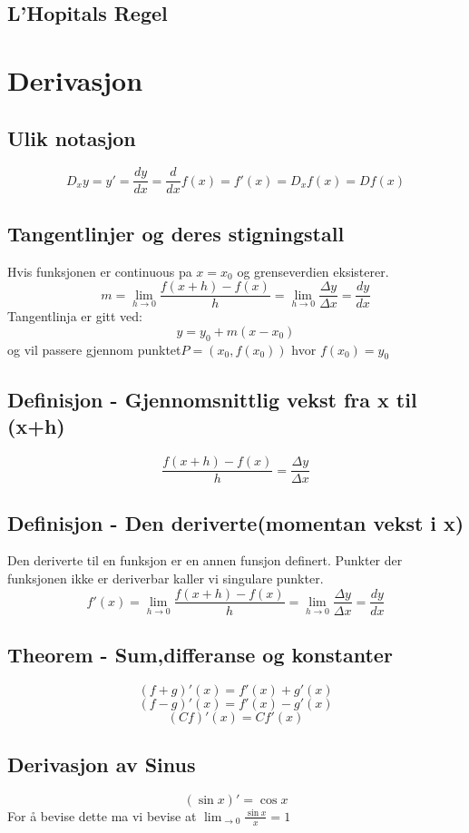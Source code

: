 \documentclass[12pt]{article}
\begin{document}
\subsection*{L'Hopitals Regel}


\newpage\section{Derivasjon}
\subsection*{Ulik notasjon}
\[D_x y=y'=\frac{dy}{dx}=\frac{d}{dx}f(x)=f'(x)=D_x f(x)=Df(x)\]
\subsection*{Tangentlinjer og deres stigningstall}
Hvis funksjonen er continuous pa $x = x_0$ og grenseverdien eksisterer.
\[m =\lim_{h\to0}\frac{f(x+h)-f(x)}{h}=\lim_{h\to0}\frac{\Delta y}{\Delta x}=\frac{dy}{dx}\]
Tangentlinja er gitt ved:
\[y = y_0 + m(x-x_0)\]
og vil passere gjennom punktet$P=(x_0,f(x_0))$
\newline hvor $f(x_0)=y_0$
\subsection*{Definisjon - Gjennomsnittlig vekst fra x til (x+h)}
\[\frac{f(x+h)-f(x)}{h}=\frac{\Delta y}{\Delta x}\]
\subsection*{Definisjon - Den deriverte(momentan vekst i x)}
Den deriverte til en funksjon er en annen funsjon definert.
\newline Punkter der funksjonen ikke er deriverbar kaller vi singulare punkter.
\[f'(x)=\lim_{h\to0}\frac{f(x+h)-f(x)}{h}=\lim_{h\to0}\frac{\Delta y}{\Delta x}=\frac{dy}{dx}\]
\subsection*{Theorem - Sum,differanse og konstanter}
\[(f+g)'(x) = f'(x)+g'(x)\]
\[(f-g)'(x) = f'(x)-g'(x)\]
\[(Cf)'(x) = Cf'(x)\]
\subsection*{Derivasjon av Sinus}
\[(\sin x)'=\cos x\]
For å bevise dette ma vi bevise at $\lim_{\to0}\frac{\sin x}{x}=1$ 
\end{document}
